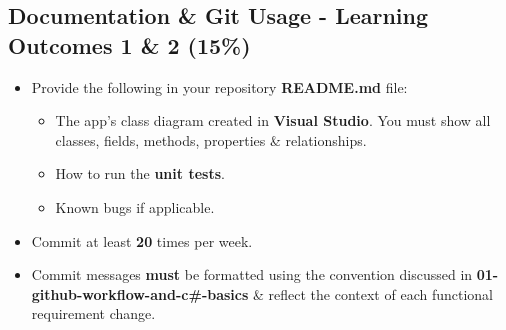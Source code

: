\documentclass{article}
\begin{document}
\subsection*{Documentation \& Git Usage - Learning Outcomes 1 \& 2 (15\%)}
\begin{itemize}
    \item Provide the following in your repository \textbf{README.md} file:
    \begin{itemize}
        \item The app's class diagram created in \textbf{Visual Studio}. You must show all classes, fields, methods, properties \& relationships.
        \item How to run the \textbf{unit tests}.
        \item Known bugs if applicable.
    \end{itemize}
    \item Commit at least \textbf{20} times per week.
    \item Commit messages \textbf{must} be formatted using the convention discussed in \textbf{01-github-workflow-and-c\#-basics} \& reflect the context of each functional requirement change.
\end{itemize}
\end{document}
